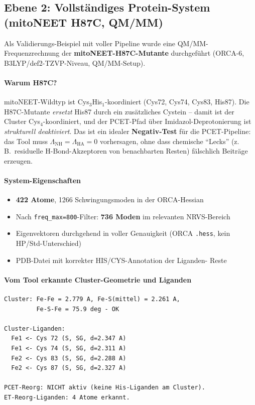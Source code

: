\documentclass[11pt,a4paper,twoside]{article}
\theoremstyle{remark}
\begin{document}
\subsection{Ebene 2: Vollst\"andiges Protein-System
            (mitoNEET H87C, QM/MM)}
\label{sec:val-mitoneet-h87c}

Als Validierungs-Beispiel mit voller Pipeline wurde eine
QM/MM-Frequenzrechnung der \textbf{mitoNEET-H87C-Mutante}
durchgef\"uhrt (ORCA-6, B3LYP/def2-TZVP-Niveau, QM/MM-Setup).

\paragraph{Warum H87C?}
mitoNEET-Wildtyp ist Cys$_3$His$_1$-koordiniert (Cys72, Cys74,
Cys83, His87). Die H87C-Mutante \emph{ersetzt} His87 durch ein
zus\"atzliches Cystein -- damit ist der Cluster Cys$_4$-koordiniert,
und der PCET-Pfad \"uber Imidazol-Deprotonierung ist
\emph{strukturell deaktiviert}. Das ist ein idealer
\textbf{Negativ-Test} f\"ur die PCET-Pipeline: das Tool muss
$\Lambda_\text{NH} = \Lambda_\text{HA} = 0$ vorhersagen, ohne dass
chemische "`Lecks"' (z.\,B.\ residuelle H-Bond-Akzeptoren von
benachbarten Resten) f\"alschlich Beitr\"age erzeugen.

\paragraph{System-Eigenschaften}
\begin{itemize}\setlength{\itemsep}{0pt}
  \item \textbf{422 Atome}, 1266 Schwingungsmoden in der ORCA-Hessian
  \item Nach \texttt{freq\_max=800}-Filter: \textbf{736 Moden} im
        relevanten NRVS-Bereich
  \item Eigenvektoren durchgehend in voller Genauigkeit
        (ORCA \texttt{.hess}, kein HP/Std-Unterschied)
  \item PDB-Datei mit korrekter HIS/CYS-Annotation der Liganden-
        Reste
\end{itemize}

\paragraph{Vom Tool erkannte Cluster-Geometrie und Liganden}

\begin{verbatim}
Cluster: Fe-Fe = 2.779 A, Fe-S(mittel) = 2.261 A,
         Fe-S-Fe = 75.9 deg - OK

Cluster-Liganden:
  Fe1 <- Cys 72 (S, SG, d=2.347 A)
  Fe1 <- Cys 74 (S, SG, d=2.311 A)
  Fe2 <- Cys 83 (S, SG, d=2.288 A)
  Fe2 <- Cys 87 (S, SG, d=2.327 A)

PCET-Reorg: NICHT aktiv (keine His-Liganden am Cluster).
ET-Reorg-Liganden: 4 Atome erkannt.
\end{verbatim}
\end{document}
